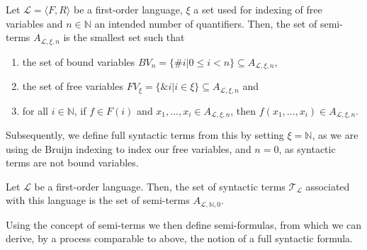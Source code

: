 \begin{definition}\label{def:sem-t}
    \leanok
    Let $\mathcal{L} = \langle F, R \rangle$ be a first-order language, $\xi$ a set used for indexing of free variables and $n \in \mathbb{N}$ an intended number of quantifiers. Then, the set of semi-terms $A_{\mathcal{L},\xi,n}$ is the smallest set such that
    \begin{enumerate}
        \item the set of bound variables $BV_n = \{\#i | 0 \leq i < n\} \subseteq A_{\mathcal{L},\xi,n}$,
        \item the set of free variables $FV_\xi = \{\&i | i \in \xi\} \subseteq A_{\mathcal{L},\xi,n}$ and
        \item for all $i \in \mathbb{N}$, if $f \in F(i)$ and $x_1,...,x_i \in A_{\mathcal{L},\xi,n}$, then $f(x_1,...,x_i) \in A_{\mathcal{L},\xi,n}$.
    \end{enumerate}
\end{definition}

Subsequently, we define full syntactic terms from this by setting $\xi = \mathbb{N}$, as we are using de Bruijn indexing to index our free variables, and $n = 0$, as syntactic terms are not bound variables.

\begin{definition}\label{def:syn-t}
    \leanok
    Let $\mathcal{L}$ be a first-order language. Then, the set of syntactic terms $\mathcal{T}_{\mathcal{L}}$ associated with this language is the set of semi-terms $A_{\mathcal{L},\mathbb{N},0}$. 
\end{definition}

Using the concept of semi-terms we then define semi-formulas, from which we can derive, by a process comparable to above, the notion of a full syntactic formula.

